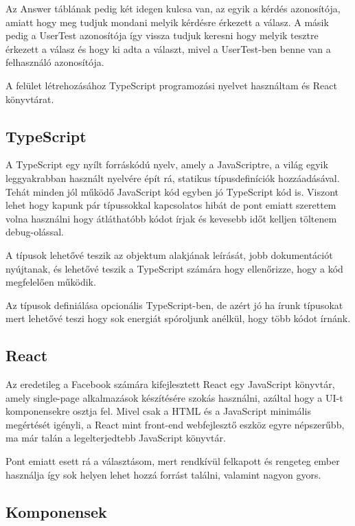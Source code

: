 Az Answer táblának pedig két idegen kulcsa van, az egyik a kérdés azonosítója, amiatt hogy meg tudjuk mondani melyik kérdésre érkezett a válasz. A másik pedig a UserTest azonosítója így vissza tudjuk keresni hogy melyik tesztre érkezett a válasz és hogy ki adta a választ, mivel a UserTest-ben benne van a felhasználó azonosítója.


A felület létrehozásához TypeScript programozási nyelvet használtam és React könyvtárat.

\subsection{TypeScript}

A TypeScript egy nyílt forráskódú nyelv, amely a JavaScriptre, a világ egyik leggyakrabban használt nyelvére épít rá, statikus típusdefiníciók hozzáadásával. Tehát minden jól működő JavaScript kód egyben jó TypeScript kód is. Viszont lehet hogy kapunk pár típussokkal kapcsolatos hibát de pont emiatt szerettem volna használni hogy átláthatóbb kódot írjak és kevesebb időt kelljen töltenem debug-olással. \bigskip

A típusok lehetővé teszik az objektum alakjának leírását, jobb dokumentációt nyújtanak, és lehetővé teszik a TypeScript számára hogy ellenőrizze, hogy a kód megfelelően működik.\bigskip

Az típusok definiálása opcionális TypeScript-ben, de azért jó ha írunk típusokat mert lehetővé teszi hogy sok energiát spóroljunk anélkül, hogy több kódot írnánk.

\subsection{React}

Az eredetileg a Facebook számára kifejlesztett React egy JavaScript könyvtár, amely single-page alkalmazások készítésére szokás használni, azáltal hogy a UI-t komponensekre osztja fel. Mivel csak a HTML és a JavaScript  minimális megértését igényli, a React mint front-end webfejlesztő eszköz egyre népszerűbb, ma már talán a legelterjedtebb JavaScript könyvtár. \bigskip

Pont emiatt esett rá a választásom, mert rendkívül felkapott és rengeteg ember használja így sok helyen lehet hozzá forrást találni, valamint nagyon gyors.

\subsection{Komponensek}

